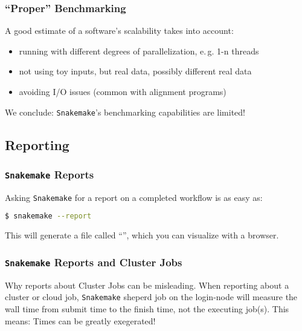\begin{frame}
  \frametitle{``Proper'' Benchmarking}
  A good estimate of a software's scalability takes into account:
  \begin{itemize}[<+->]
   \item running with different degrees of parallelization, e.\,g. 1-n threads
   \item not using toy inputs, but real data, possibly different real data
   \item avoiding I/O issues (common with alignment programs)
  \end{itemize}
  \pause
  \begin{warning}
  	We conclude: \texttt{Snakemake}'s benchmarking capabilities are limited!
  \end{warning}
\end{frame}


\subsection{Reporting}


\begin{frame}[fragile]
  \frametitle{\texttt{Snakemake} Reports}
  Asking \texttt{Snakemake} for a report on a completed workflow is as easy as:
  \begin{lstlisting}[language=Bash, style=Shell]
$ snakemake --report
  \end{lstlisting}
  This will generate a file called ``'', which you can visualize with a browser.
\end{frame} 

\begin{frame}
  \frametitle{\texttt{Snakemake} Reports and Cluster Jobs}
  \begin{alertblock}{Why reports about Cluster Jobs can be misleading.}
    When reporting about a cluster or cloud job, \texttt{Snakemake} sheperd job on the login-node will measure the wall time from submit time to the finish time, not the executing job(s).\newline
    This means: Times can be greatly exegerated!
  \end{alertblock}
\end{frame} 

